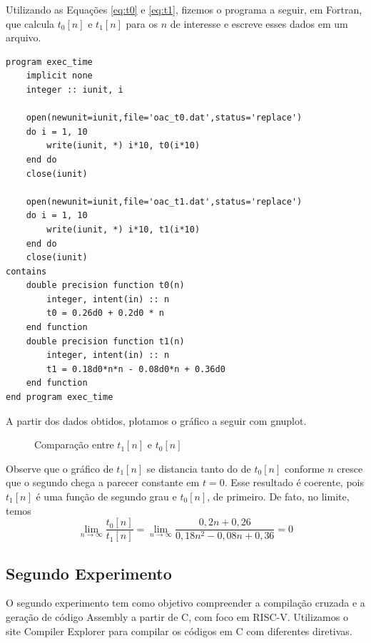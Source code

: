 \documentclass[a4paper,12pt]{article}
\newenvironment{code}{\captionsetup{type=listing}}{}
\begin{document}
Utilizando as Equações \eqref{eq:t0} e \eqref{eq:t1}, fizemos o programa a seguir, em Fortran, que calcula $t_0[n]$ e $t_1[n]$ para os $n$ de interesse e escreve esses dados em um arquivo.
\begin{code}
    \begin{verbatim}
program exec_time
    implicit none
    integer :: iunit, i
    
    open(newunit=iunit,file='oac_t0.dat',status='replace')
    do i = 1, 10
        write(iunit, *) i*10, t0(i*10)
    end do
    close(iunit)
    
    open(newunit=iunit,file='oac_t1.dat',status='replace')
    do i = 1, 10
        write(iunit, *) i*10, t1(i*10)
    end do
    close(iunit)
contains
    double precision function t0(n)
        integer, intent(in) :: n
        t0 = 0.26d0 + 0.2d0 * n
    end function
    double precision function t1(n)
        integer, intent(in) :: n
        t1 = 0.18d0*n*n - 0.08d0*n + 0.36d0
    end function
end program exec_time
    \end{verbatim}
    \vspace{-12pt}
    \caption{Programa em Fortran para calcular $t_0[n]$ e $t_1[n]$ para os argumentos pedidos}
\end{code}
\noindent A partir dos dados obtidos, plotamos o gráfico a seguir com gnuplot.

\begin{figure}[H]
    \centering
    
    \vspace{-40pt}
    \caption{Comparação entre $t_1[n]$ e $t_0[n]$}
    \vspace{-10pt}
    \label{fig:placeholder}
\end{figure}

Observe que o gráfico de $t_1[n]$ se distancia tanto do de $t_0[n]$ conforme $n$ cresce que o segundo chega a parecer constante em $t = 0$. Esse resultado é coerente, pois $t_1[n]$ é uma função de segundo grau e $t_0[n]$, de primeiro. De fato, no limite, temos
\[
\lim_{n\to\infty} \frac{t_0[n]}{t_1[n]} =\lim_{n\to\infty} \frac{0,2n + 0,26}{0,18 n^2 - 0,08n + 0,36} = 0
\]

\subsection{Segundo Experimento}
O segundo experimento tem como objetivo compreender a compilação cruzada e a geração de código Assembly a partir de C, com foco em RISC-V. Utilizamos o site Compiler Explorer para compilar os códigos em C com diferentes diretivas.
\end{document}
